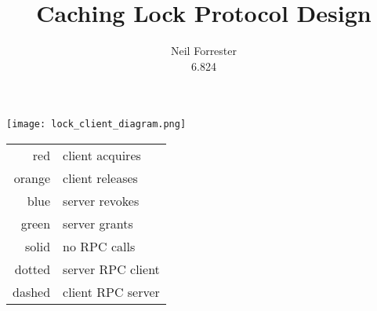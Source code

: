 \documentclass{article}
\title{Caching Lock Protocol Design}
\author{Neil Forrester\\6.824}
\begin{document}
\texttt{[image: lock\_client\_diagram.png]}

\begin{tabular}{r | l}
red & client acquires \\
orange & client releases \\
\hline
blue & server revokes \\
green & server grants \\
\hline
solid & no RPC calls \\
dotted & server RPC client \\
dashed & client RPC server \\
\end{tabular}
\end{document}

